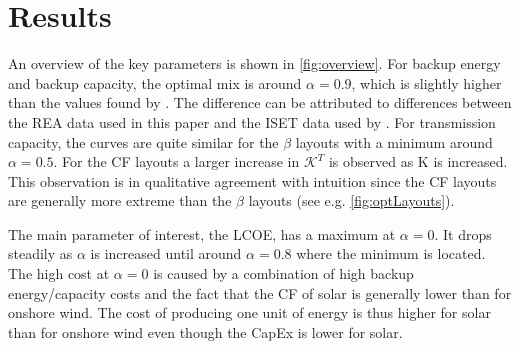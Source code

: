 \documentclass[a4paper, 5p, sort&compress]{elsarticle}%
\begin{document}

\section{Results}
\label{sec:results}

An overview of the key parameters is shown in \cref{fig:overview}. For
backup energy and backup capacity, the optimal mix is around
$\alpha = 0.9$, which is slightly higher than the values found by
\cite{Heide2010,Heide2011}.
The difference can be attributed to differences between the REA data
used in this paper and the ISET data \cite{iset} used by
\cite{Heide2010,Heide2011}. For transmission capacity, the curves are
quite similar for the $\beta$ layouts with a minimum around
$\alpha = 0.5$. For the CF layouts a larger increase in
$\mathcal{K}^{T}$ is observed as K is increased. This observation is
in qualitative agreement with intuition since the CF layouts are
generally more extreme than the $\beta$ layouts (see
e.g. \cref{fig:optLayouts}).


The main parameter of interest, the LCOE, has a maximum at
$\alpha = 0$. It drops steadily as $\alpha$ is increased until around
$\alpha = 0.8$ where the minimum is located. The high cost at
$\alpha = 0$ is caused by a combination of high backup energy/capacity
costs and the fact that the CF of solar is generally lower than for
onshore wind. The cost of producing one unit of energy is thus higher
for solar than for onshore wind even though the \gls{CapEx} is lower
for solar.
\end{document}
